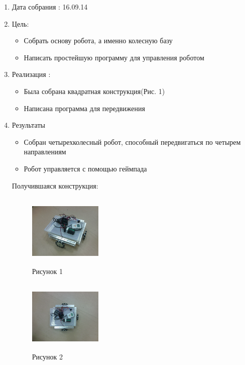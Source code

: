 \documentclass[11pt]{article}
\begin{document}
	\begin{enumerate}
		\item Дата собрания : 16.09.14
		\item Цель:
		\begin{itemize}
			\item Собрать основу робота, а именно колесную базу
			\item Написать простейшую программу для управления роботом
		\end{itemize}			
		\item Реализация :
		\begin{itemize}
			\item Была собрана квадратная конструкция(Рис. 1)
			\item Написана программа для передвижения
		\end{itemize}
		\item Результаты
		\begin{itemize}
			\item Собран четырехколесный робот, способный передвигаться по четырем направлениям
			\item Робот управляется с помощью геймпада
		\end{itemize}
		Получившаяся конструкция:
		\begin{figure} [h]
			\centering
			\begin{minipage}{0.3\linewidth}
				\includegraphics[width=35mm,height=35mm]{1_1_robot}\\ Рисунок 1
			\end{minipage}
			\begin{minipage}{0.3\linewidth}
				\includegraphics[width=35mm,height=35mm]{1_2_robot}\\ Рисунок 2
			\end{minipage}
		\end{figure}
	\end{enumerate}
\end{document}

